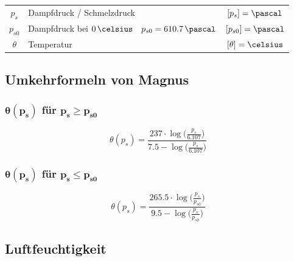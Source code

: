 \begin{tabular}{c l c}
	$p_s$ 		& Dampfdruck / Schmelzdruck 									& $[p_s] = \pascal$ 	\\
	$p_{s0}$ 	& Dampfdruck bei $0\, \celsius \quad p_{s0} = 610.7 \, \pascal$	& $[p_{s0}] = \pascal$	\\
	$\theta$ 	& Temperatur 													& $[\theta] = \celsius$
	
\end{tabular}


\subsection{Umkehrformeln von Magnus}\vspace{-1em}

\begin{minipage}[t]{0.48\columnwidth}
	\subsubsection{$\boldsymbol{\theta(p_s)}$ für $\boldsymbol{p_s \geq p_{s0}}$}

	\vspace{-0.2cm}

	$$ \boxed{ \theta(p_s) = \frac{237 \cdot \log \big( \frac{p_s}{6.107} \big) }{7.5 - \log \big( \frac{p_s}{6.107} \big)} } $$	
\end{minipage}
\hfill
\begin{minipage}[t]{0.48\columnwidth}
	\subsubsection{$\boldsymbol{\theta(p_s)}$ für $\boldsymbol{p_s \leq p_{s0}}$}

	\vspace{-0.2cm}

	$$ \boxed{ \theta(p_s) = \frac{265.5 \cdot \log \big( \frac{p_s}{p_{s0}} \big)  }{9.5 - \log \big( \frac{p_s}{p_{s0}} \big)} } $$
\end{minipage}


\subsection{Luftfeuchtigkeit}

